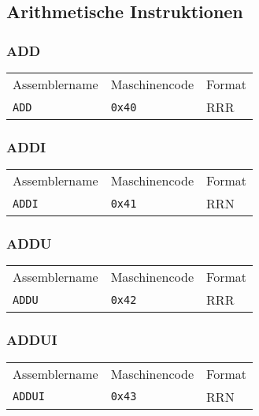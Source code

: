 \subsection{Arithmetische Instruktionen} 

\subsubsection{ADD}
\begin{center}
  \begin{tabular}{lll}
    Assemblername & Maschinencode & Format \\
    \texttt{ADD}  & \texttt{0x40} & RRR    
  \end{tabular}
\end{center}


\subsubsection{ADDI}
\begin{center}
  \begin{tabular}{lll}
    Assemblername & Maschinencode & Format \\
    \texttt{ADDI} & \texttt{0x41} & RRN    
  \end{tabular}
\end{center}



\subsubsection{ADDU}
\begin{center}
  \begin{tabular}{lll}
    Assemblername & Maschinencode & Format \\
    \texttt{ADDU} & \texttt{0x42} & RRR    
  \end{tabular}
\end{center}



\subsubsection{ADDUI}
\begin{center}
  \begin{tabular}{lll}
    Assemblername & Maschinencode & Format \\
    \texttt{ADDUI} & \texttt{0x43} & RRN    
  \end{tabular}
\end{center}





